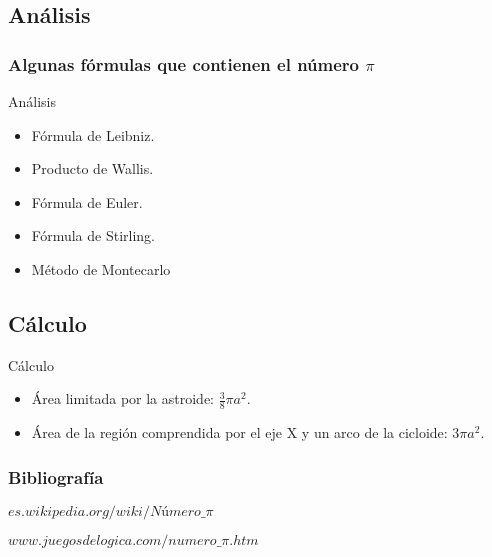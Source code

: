\documentclass{beamer}
\begin{document}
\subsection{Análisis}
\begin{frame}
\frametitle{Algunas fórmulas que contienen el número $\pi$}
\begin{block}{Análisis}
\begin{itemize}
  \item Fórmula de Leibniz.
  \pause
  \item Producto de Wallis.
  \pause
  \item Fórmula de Euler.
  \pause
  \item Fórmula de Stirling.
  \pause
  \item Método de Montecarlo

\end{itemize}
\end{block}

\end{frame}

\subsection{Cálculo} 
\begin{frame}

\begin{block}{Cálculo}
\begin{itemize}
  \item Área limitada por la astroide: $\frac{3}{8}\pi a^2 $.
  \pause

  \item Área de la región comprendida por el eje X y un arco de la cicloide: $3 \pi a^2.$

\end{itemize}
\end{block}

\end{frame}

\begin{frame}
\frametitle{Bibliografía}
\begin{thebibliography}
  \beamertermplatebookbibitems
  {\small $es.wikipedia.org/wiki/Número\_\pi$}
  
  \beamertermplatebookbibitems
  {\small $www.juegosdelogica.com/numero\_\pi.htm$}
\end{thebibliography}
\end{frame}
\end{document}
